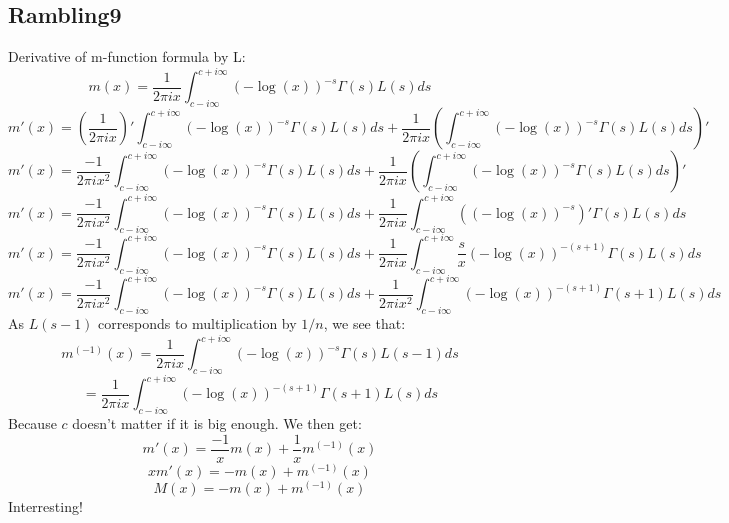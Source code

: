 \documentclass[a4paper]{amsart}
\begin{document}
\subsection{Rambling9}
Derivative of m-function formula by L:
$$m(x) = \frac{1}{2\pi i x} \int_{c - i\infty}^{c + i\infty}(-\log(x))^{-s} \Gamma(s)L(s)ds$$
$$m'(x) = \left(\frac{1}{2\pi i x}\right)' \int_{c - i\infty}^{c + i\infty}(-\log(x))^{-s} \Gamma(s)L(s)ds + \frac{1}{2\pi i x} \left(\int_{c - i\infty}^{c + i\infty}(-\log(x))^{-s} \Gamma(s)L(s)ds\right)'$$
$$m'(x) = \frac{-1}{2\pi i x^2} \int_{c - i\infty}^{c + i\infty}(-\log(x))^{-s} \Gamma(s)L(s)ds + \frac{1}{2\pi i x} \left(\int_{c - i\infty}^{c + i\infty}(-\log(x))^{-s} \Gamma(s)L(s)ds\right)'$$
$$m'(x) = \frac{-1}{2\pi i x^2} \int_{c - i\infty}^{c + i\infty}(-\log(x))^{-s} \Gamma(s)L(s)ds + \frac{1}{2\pi i x} \int_{c - i\infty}^{c + i\infty}\left((-\log(x))^{-s}\right)' \Gamma(s)L(s)ds$$
$$m'(x) = \frac{-1}{2\pi i x^2} \int_{c - i\infty}^{c + i\infty}(-\log(x))^{-s} \Gamma(s)L(s)ds + \frac{1}{2\pi i x} \int_{c - i\infty}^{c + i\infty}\frac{s}{x}(-\log(x))^{-(s + 1)} \Gamma(s)L(s)ds$$
$$m'(x) = \frac{-1}{2\pi i x^2} \int_{c - i\infty}^{c + i\infty}(-\log(x))^{-s} \Gamma(s)L(s)ds + \frac{1}{2\pi i x^2} \int_{c - i\infty}^{c + i\infty}(-\log(x))^{-(s + 1)} \Gamma(s + 1)L(s)ds$$
As $L(s - 1)$ corresponds to multiplication by $1/n$, we see that:
$$m^{(-1)}(x) = \frac{1}{2\pi i x} \int_{c - i\infty}^{c + i\infty}(-\log(x))^{-s} \Gamma(s)L(s - 1)ds$$
$$ = \frac{1}{2\pi i x} \int_{c - i\infty}^{c + i\infty}(-\log(x))^{-(s + 1)} \Gamma(s + 1)L(s)ds$$
Because $c$ doesn't matter if it is big enough. We then get:
$$m'(x) = \frac{-1}{x} m(x) + \frac{1}{x} m^{(-1)}(x)$$
$$xm'(x) = -m(x) + m^{(-1)}(x)$$
$$M(x) = -m(x) + m^{(-1)}(x)$$
Interresting!
\end{document}

